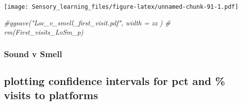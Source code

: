\documentclass[]{article}
\newenvironment{Shaded}{\begin{snugshade}}{\end{snugshade}}
\newcommand{\CommentTok}[1]{\textcolor[rgb]{0.56,0.35,0.01}{\textit{{#1}}}}
\begin{document}
\texttt{[image: Sensory\_learning\_files/figure-latex/unnamed-chunk-91-1.pdf]}

\begin{Shaded}
\begin{Highlighting}[]
  \CommentTok{#ggsave("Loc_v_smell_first_visit.pdf", width = zz  )}
 \CommentTok{# rm(First_visits_LvSm_p)}
\end{Highlighting}
\end{Shaded}

\subsubsection{Sound v Smell}\label{sound-v-smell-3}

\subsection{plotting confidence intervals for pct and \% visits to
platforms}\label{plotting-confidence-intervals-for-pct-and-visits-to-platforms-3}
\end{document}
